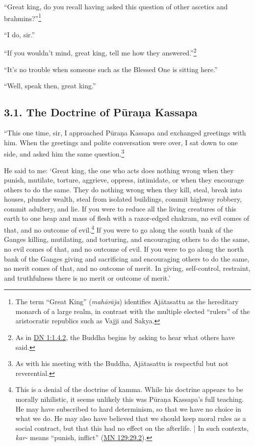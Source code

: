 \documentclass[12pt,openany]{book}%
\begin{document}
“Great king, do you recall having asked this question of other ascetics and brahmins?”\footnote{The term “Great King” (\textit{\textsanskrit{mahārāja}}) identifies \textsanskrit{Ajātasattu} as the hereditary monarch of a large realm, in contrast with the multiple elected “rulers” of the aristocratic republics such as Vajji and Sakya. } 

“I do, sir.” 

“If you wouldn’t mind, great king, tell me how they answered.”\footnote{As in \href{https://suttacentral.net/dn1/en/sujato\#1.4.2}{DN 1:1.4.2}, the Buddha begins by asking to hear what others have said. } 

“It’s no trouble when someone such as the Blessed One is sitting here.” 

“Well, speak then, great king.” 

\subsection*{3.1. The Doctrine of \textsanskrit{Pūraṇa} Kassapa }

“This one time, sir, I approached \textsanskrit{Pūraṇa} Kassapa and exchanged greetings with him. When the greetings and polite conversation were over, I sat down to one side, and asked him the same question.\footnote{As with his meeting with the Buddha, \textsanskrit{Ajātasattu} is respectful but not reverential. } 

He said to me: ‘Great king, the one who acts does nothing wrong when they punish, mutilate, torture, aggrieve, oppress, intimidate, or when they encourage others to do the same. They do nothing wrong when they kill, steal, break into houses, plunder wealth, steal from isolated buildings, commit highway robbery, commit adultery, and lie. If you were to reduce all the living creatures of this earth to one heap and mass of flesh with a razor-edged chakram, no evil comes of that, and no outcome of evil.\footnote{This is a denial of the doctrine of kamma. While his doctrine appears to be morally nihilistic, it seems unlikely this was \textsanskrit{Pūraṇa} Kassapa’s full teaching. He may have subscribed to hard determinism, so that we have no choice in what we do. He may also have believed that we should keep moral rules as a social contract, but that this had no effect on the afterlife. | In such contexts, \textit{kar-} means “punish, inflict” (\href{https://suttacentral.net/mn129/en/sujato\#29.2}{MN 129:29.2}). } If you were to go along the south bank of the Ganges killing, mutilating, and torturing, and encouraging others to do the same, no evil comes of that, and no outcome of evil. If you were to go along the north bank of the Ganges giving and sacrificing and encouraging others to do the same, no merit comes of that, and no outcome of merit. In giving, self-control, restraint, and truthfulness there is no merit or outcome of merit.’ 
\end{document}

